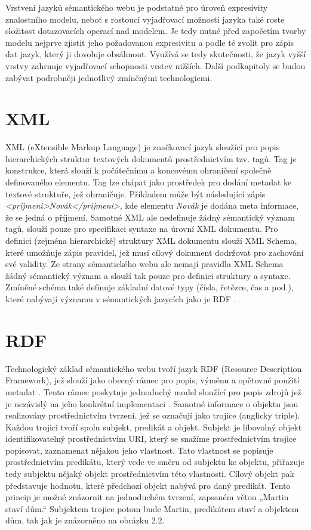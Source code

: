 \documentclass{projekt}
\begin{document}
Vrstvení jazyků sémantického webu je podstatné pro úroveň expresivity znalostního modelu, neboť s rostoucí vyjadřovací možností jazyka také roste složitost dotazovacích operací nad modelem. Je tedy nutné před započetím tvorby modelu nejprve zjistit jeho požadovanou expresivitu a podle té zvolit pro zápis dat jazyk, který ji dovoluje obsáhnout. Využívá se tedy skutečnosti, že jazyk vyšší vrstvy zahrnuje vyjadřovací schopnosti vrstev nižších\cite{_2}. 
Další podkapitoly se budou zabývat podrobněji jednotlivý zmíněnými technologiemi.

\section{XML}
\hspace{0.65cm}XML (eXtensible Markup Language) je značkovací jazyk sloužící pro popis hierarchických struktur textových dokumentů prostřednictvím tzv. tagů. Tag je konstrukce, která slouží k počátečnímu a koncovému ohraničení společně definovaného elementu. Tag lze chápat jako prostředek pro dodání metadat ke textové struktuře, jež ohraničuje. Příkladem může být následující zápis {\it <prijmeni>Novák</prijmeni>}, kde elementu {\it Novák} je dodána meta informace, že se jedná o příjmení. Samotné XML ale nedefinuje žádný sémantický význam tagů, slouží pouze pro specifikaci syntaxe na úrovní XML dokumentu. Pro definici (zejména hierarchické) struktury XML dokumentu slouží XML Schema, které umožňuje zápis pravidel, jež musí cílový dokument dodržovat pro zachování své validity. Ze strany sémantického webu ale nemají pravidla XML Schema žádný sémantický význam a slouží tak pouze pro definici struktury a syntaxe. Zmíněné schéma také definuje základní datové typy (čísla, řetězce, čas a pod.), které nabývají významu v sémantických jazycích jako je RDF \cite{_3}.


\section{RDF}
\hspace{0.65cm}Technologický základ sémantického webu tvoří jazyk RDF (Resource Description Framework), jež slouží jako obecný rámec pro popis, výměnu a opětovné použití metadat \cite{_3}. Tento rámec poskytuje jednoduchý model sloužící pro popis zdrojů jež je nezávislý na jeho konkrétní implementaci \cite{_4}. Samotné informace o objektu jsou realizovány prostřednictvím tvrzení, jež se označují jako trojice (anglicky triple). Každou trojici tvoří spolu subjekt, predikát a objekt. Subjekt je libovolný objekt identifikovatelný prostřednictvím URI, který se snažíme prostřednictvím trojice popisovat, zaznamenat nějakou jeho vlastnost. Tato vlastnost se popisuje prostřednictvím predikátu, který vede ve směru od subjektu ke objektu, přiřazuje tedy subjektu nějaký objekt prostřednictvím této vlastnosti. Cílový objekt pak představuje hodnotu, které předchozí objekt nabývá pro daný predikát. 
Tento princip je možné znázornit na jednoduchém tvrzení, zapsaném větou „Martin staví dům.“ Subjektem trojice potom bude Martin, predikátem staví a objektem dům, tak jak je znázorněno na obrázku 2.2. 
\\
\vspace{0.1cm}
\end{document}
